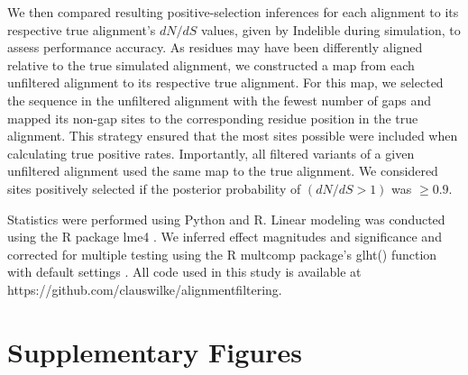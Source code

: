 \documentclass[11pt]{article}
\begin{document}
We then compared resulting positive-selection inferences for each alignment to its respective true alignment's $dN/dS$ values, given by Indelible during simulation, to assess performance accuracy. As residues may have been differently aligned relative to the true simulated alignment, we constructed a map from each unfiltered alignment to its respective true alignment. For this map, we selected the sequence in the unfiltered alignment with the fewest number of gaps and mapped its non-gap sites to the corresponding residue position in the true alignment. This strategy ensured that the most sites possible were included when calculating true positive rates. Importantly, all filtered variants of a given unfiltered alignment used the same map to the true alignment. We considered sites positively selected if the posterior probability of $(dN/dS>1)$ was $\geq0.9$.

Statistics were performed using Python and R. Linear modeling was conducted using the R package lme4 \citep{Bates2012}. We inferred effect magnitudes and significance and corrected for multiple testing using the R multcomp package's glht() function with default settings \citep{Hothorn2008}. All code used in this study is available at https://github.com/clauswilke/alignment\underline{\hspace*{0.2cm}}filtering.



\newpage
\section*{Supplementary Figures}
\end{document}
